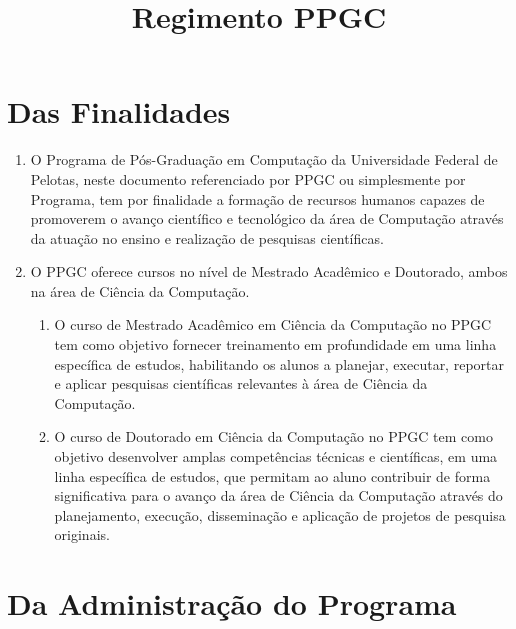 \documentclass{article}
\title{Regimento PPGC}
\begin{document}
\maketitle

\section{Das Finalidades}

\begin{enumerate}
\item O Programa de Pós-Graduação em Computação da Universidade Federal de Pelotas, neste documento referenciado por PPGC ou simplesmente por Programa, tem por finalidade a formação de recursos humanos capazes de promoverem o avanço científico e tecnológico da área de Computação através da atuação no ensino e realização de pesquisas científicas.

\item O PPGC oferece cursos no nível de Mestrado Acadêmico e Doutorado, ambos na área de Ciência da Computação.
\begin{enumerate}
	\item O curso de Mestrado Acadêmico em Ciência da Computação no PPGC tem como objetivo fornecer treinamento em profundidade em uma linha específica de estudos, habilitando os alunos a planejar, executar, reportar e aplicar pesquisas científicas relevantes à área de Ciência da Computação.

	\item O curso de Doutorado em Ciência da Computação no PPGC tem como objetivo desenvolver amplas competências técnicas e científicas, em uma linha específica de estudos, que permitam ao aluno contribuir de forma significativa para o avanço da área de Ciência da Computação através do planejamento, execução, disseminação e aplicação de projetos de pesquisa originais.

\end{enumerate}

\end{enumerate}

\section{Da Administração do Programa}
\end{document}
